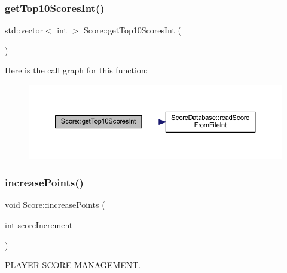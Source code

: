 \mbox{\label{class_score_a5f1d05dd49200b53b806751a6e9d6fbe}} 
\subsubsection{\texorpdfstring{get\+Top10\+Scores\+Int()}{getTop10ScoresInt()}}
{\footnotesize\ttfamily std\+::vector$<$ int $>$ Score\+::get\+Top10\+Scores\+Int (\begin{DoxyParamCaption}{ }\end{DoxyParamCaption})}

Here is the call graph for this function\+:\nopagebreak
\begin{figure}[H]
\begin{center}
\leavevmode
\includegraphics[width=350pt]{class_score_a5f1d05dd49200b53b806751a6e9d6fbe_cgraph}
\end{center}
\end{figure}
\mbox{\label{class_score_a017f4ad80df1e9d51e62789d8e5e9605}} 
\subsubsection{\texorpdfstring{increase\+Points()}{increasePoints()}}
{\footnotesize\ttfamily void Score\+::increase\+Points (\begin{DoxyParamCaption}\item[{int}]{score\+Increment }\end{DoxyParamCaption})}



P\+L\+A\+Y\+ER S\+C\+O\+RE M\+A\+N\+A\+G\+E\+M\+E\+NT. 

